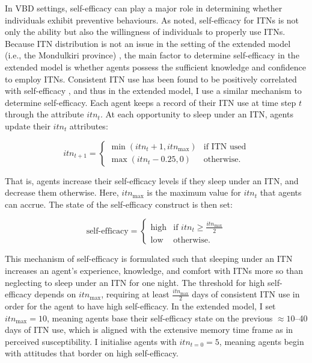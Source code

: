 In VBD settings, self-efficacy can play a major role in determining whether individuals exhibit preventive behaviours. As \citet{watanabe_determinants_2014} noted, self-efficacy for ITNs is not only the ability but also the willingness of individuals to properly use ITNs. Because ITN distribution is not an issue in the setting of the extended model (i.e., the Mondulkiri province) \cite{sandfort_forest_2020}, the main factor to determine self-efficacy in the extended model is whether agents possess the sufficient knowledge and confidence to employ ITNs. Consistent ITN use has been found to be positively correlated with self-efficacy \cite{kakaire_role_2023}, and thus in the extended model, I use a similar mechanism to determine self-efficacy. Each agent keeps a record of their ITN use at time step $t$ through the attribute $itn_t$. At each opportunity to sleep under an ITN, agents update their $itn_t$ attributes:

\begin{equation}\label{eq:itn-score}
    itn_{t+1}=\begin{cases}
        \min(itn_t+1,itn_{\max}) & \text{if ITN used} \\
        \max(itn_t-0.25,0) & \text{otherwise.}
    \end{cases}
\end{equation}

That is, agents increase their self-efficacy levels if they sleep under an ITN, and decrease them otherwise. Here, $itn_{\max}$ is the maximum value for $itn_t$ that agents can accrue. The state of the self-efficacy construct is then set:

\begin{equation}\label{eq:hbm-self-efficacy}
    \text{self-efficacy}=\begin{cases}
        \text{high} & \text{if }itn_t\ge\frac{itn_{\max}}{2} \\
        \text{low} & \text{otherwise.}
    \end{cases}
\end{equation}

This mechanism of self-efficacy is formulated such that sleeping under an ITN increases an agent's experience, knowledge, and comfort with ITNs more so than neglecting to sleep under an ITN for one night. The threshold for high self-efficacy depends on $itn_{\max}$, requiring at least $\frac{itn_{\max}}{2}$ days of consistent ITN use in order for the agent to have high self-efficacy. In the extended model, I set $itn_{\max}=10$, meaning agents base their self-efficacy state on the previous $\approx10$--40 days of ITN use, which is aligned with the extensive memory time frame as in perceived susceptibility. I initialise agents with $itn_{t=0}=5$, meaning agents begin with attitudes that border on high self-efficacy.

